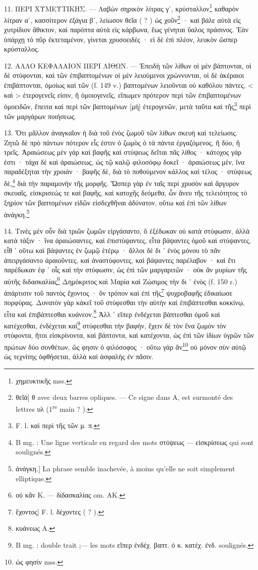 \documentclass[a4paper, 11pt, oneside, polutonikogreek, french]{article}
\begin{document}
\paragraph{}
11. ΠΕΡΙ ΧΥΜΕΥΤΙΚΗΣ. --- Λαβὼν σηρικὸν λίτρας γʹ, κρύσταλλον\footnote{χημευκτικῆς mss.} καθαρὸν λίτραν αʹ, κασσίτερον ἑξάγια βʹ, λείωσον θεῖα ( ? ) ὡς χοῦν\footnote{θεῖά] θ avec deux barres opliques. --- Ce signe dans A, est surmonté des lettres υλ (1\textsuperscript{re} main ? ).} · καὶ βάλε αὐτὰ εἰς χυτρίδιον ἄθικτον, καὶ παρόπτα αὐτὰ εἰς κάρβωνα, ἕως γένηται ὕαλος πράσινος. Ἐὰν ὑπάρχῃ τὸ πῦρ ἐκτεταμένον, γίνεται χρυσοειδές · εἰ δὲ ἐπὶ πλέον, λευκὸν ὥσπερ κρύσταλλος.

12. ΑΛΛΟ ΚΕΦΑΛΑΙΟΝ ΠΕΡΙ ΛΙΘΩΝ. --- Ἐπειδὴ τῶν λίθων οἱ μὲν βάπτονται, οἱ δὲ στύφονται, καὶ τῶν ἐπιβαπτομένων οἱ μὲν λειούμενοι χρώννυνται, οἱ δὲ ἀκέραιοι ἐπιβάπτονται, ὁμοίως καὶ τῶν (f. 149 v.) βαπτομένων λειοῦνται οὐ καθόλου πάντες, < καὶ > ἑτερογενεῖς εἰσιν, ἢ ὁμοιογενεῖς, εἴπωμεν πρότερον περὶ τῶν ἐπιβαπτομένων ὁμοειδῶν, ἔπειτα καὶ περὶ τῶν βαπτομένων [μὴ] ἑτερογενῶν, μετὰ ταῦτα καὶ τῆς\footnote{F. l. καὶ περὶ τῆς τῶν μ. π.} περὶ τῶν μαργάρων ποιήσεως.

13. Ὅτι μᾶλλον ἀναγκαῖον ἡ διὰ τοῦ ἐνὸς ζωμοῦ τῶν λίθων σκευὴ καὶ τελείωσις. Ζητῶ δὲ πρὸ πάντων πότερον εἷς ἐστιν ὁ ζωμὸς ὁ τὰ πάντα ἐργαζόμενος, ἢ δύο, ἢ τρεῖς. Ἀραιώσεως μὲν γάρ καὶ βαφῆς καὶ στύψεως δεῖται πᾶς λίθος · κάτοχος γάρ ἐστι · τάχα δὲ καὶ ἀραιώσεως, ὡς τῷ καλῷ φιλοσόφῳ δοκεῖ · ἀραιώσεως μὲν, ἵνα παραδέξηται τὴν χροιάν · βαφῆς δὲ, διὰ τὸ ποθούμενον κάλλος καὶ τέλος · στύψεως δὲ,\footnote{B mg. : Une ligne verticale en regard des mots στύψεως --- εἰσκρίσεως qui sont soulignés.} διὰ τὴν παραμονὴν τῆς μορφῆς. Ὥσπερ γὰρ ἐν ταῖς περὶ χρυσὸν καὶ ἄργυρον σκευαῖς, εἰσκρισεώς τε καὶ βαφῆς, καὶ κατοχῆς δεόμεθα, ὧν ἄνευ τῆς τελειότητος τὸ ξηρίον τῶν βαπτομένων εἰδῶν εἰσδεχθῆναι ἀδύνατον, οὕτω καὶ ἐπὶ τῶν λίθων ἀνάγκη.\footnote{ἀνάγκη.] La phrase semble inachevée, à moins qu'elle ne soit simplement elliptique.}

14. Τινὲς μὲν οὖν διὰ τριῶν ζωμῶν εἰργάσαντο, ὃ ἐξέδωκαν οὐ κατὰ στύφωσιν, ἀλλὰ κατὰ τάξιν · ἵνα ἀραιώσαντες, καὶ ἐπιστύψαντες, εἶτα βάψαντες ὁμοῦ καὶ στύψαντες, εἶθ ᾽ οὕτω καὶ βάψαντες ἐν ζωμῷ ἑτέρῳ · ἄλλοι δὲ δι ᾽ ἑνὸς μόνου τὸ πᾶν ἀπειργάσαντο ἀραιοῦντες, καὶ ἀναστύφοντες, καὶ βάψαντες παρέλαβον · καὶ ἔτι παρέδωκαν ἐφ ᾽ οἷς καὶ τὴν στύφωσιν, ὡς ἐπὶ τῶν μαργαριτῶν · οὐκ ἂν μυρίων τῆς αὐτῆς διδασκαλίας\footnote{οὐ κἂν K. --- διδασκαλίας om. AK.} Δημόκριτος καὶ Μαρία καὶ Ζώσιμος τὴν δι ᾽ ἑνὸς (f. 150 r.) ἀπάρτισιν τοῦ παντὸς ἔχοντος · ὃν τρόπον καὶ ἐπὶ τῆς\footnote{ἔχοντος] F. l. δέχοντες ( ? ).} ψυχροβαφῆς ἐδικαίωσε πορφύρας. Δυνατὸν γὰρ κἀκεῖ τοῦ στύφεσθαι τὴν αὐτὴν καὶ ἐπιβάπτεσθαι κοκκίνῳ, εἶτα καὶ ἐπιβάπτεσθαι κυάνεον.\footnote{κυάνεως A.} Ἀλλ ᾽ εἴπερ ἐνδέχεται βάπτεσθαι ὁμοῦ καὶ κατέχεσθαι, ἐνδέχεται καὶ\footnote{B mg. : double trait ;--- les mots εἴπερ ἐνδέχ. βαπτ. ὁ κ. κατέχ. ἐνδ. soulignés.} στύφεσθαι τὴν βαφὴν, ἔχειν δὲ τὸν ἕνα ζωμὸν τὸν στύφοντα, ἤτοι εἰσκρίνοντα, καὶ βάπτοντα, καὶ κατέχοντα, ὡς ἐπὶ τῶν ἰδίων ὑγρῶν τῶν πρώτων δύο συνθέτων, ὥς φησιν ὁ φιλόσοφος · οὕτω γὰρ ἂν\footnote{ὡς φησὶν mss.} οὐ μόνον σὺν αὐτῷ ὡς τεχνίτης ὀφθήσεται, ἀλλὰ καὶ ἀσφαλὴς ἐν πᾶσιν.
\end{document}
